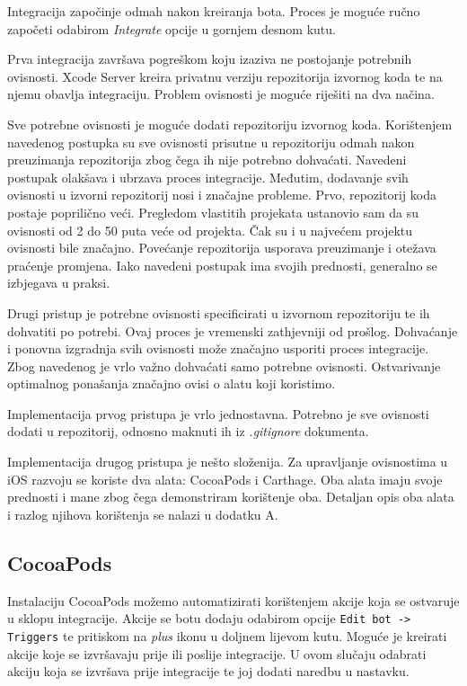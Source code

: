 \documentclass[times, utf8, diplomski, numeric]{fer}
\begin{document}
\begin{appendices}
Integracija započinje odmah nakon kreiranja bota. Proces je moguće ručno započeti odabirom \textit{Integrate} opcije u gornjem desnom kutu.

Prva integracija završava pogreškom koju izaziva ne postojanje potrebnih ovisnosti. Xcode Server kreira privatnu verziju repozitorija izvornog koda te na njemu obavlja integraciju. Problem ovisnosti je moguće riješiti na dva načina.

Sve potrebne ovisnosti je moguće dodati repozitoriju izvornog koda. Korištenjem navedenog postupka su sve ovisnosti prisutne u repozitoriju odmah nakon preuzimanja repozitorija zbog čega ih nije potrebno dohvaćati. Navedeni postupak olakšava i ubrzava proces integracije. Međutim, dodavanje svih ovisnosti u izvorni repozitorij nosi i značajne probleme. Prvo, repozitorij koda postaje poprilično veći. Pregledom vlastitih projekata ustanovio sam da su ovisnosti od 2 do 50 puta veće od projekta. Čak su i u najvećem projektu ovisnosti bile značajno. Povećanje repozitorija usporava preuzimanje i otežava praćenje promjena. Iako navedeni postupak ima svojih prednosti, generalno se izbjegava u praksi.

Drugi pristup je potrebne ovisnosti specificirati u izvornom repozitoriju te ih dohvatiti po potrebi. Ovaj proces je vremenski zathjevniji od prošlog. Dohvaćanje i ponovna izgradnja svih ovisnosti može značajno usporiti proces integracije. Zbog navedenog je vrlo važno dohvaćati samo potrebne ovisnosti. Ostvarivanje optimalnog ponašanja značajno ovisi o alatu koji koristimo.

Implementacija prvog pristupa je vrlo jednostavna. Potrebno je sve ovisnosti dodati u repozitorij, odnosno maknuti ih iz \textit{.gitignore} dokumenta.

Implementacija drugog pristupa je nešto složenija. Za upravljanje ovisnostima u iOS razvoju se koriste dva alata: CocoaPods i Carthage. Oba alata imaju svoje prednosti i mane zbog čega demonstriram korištenje oba. Detaljan opis oba alata i razlog njihova korištenja se nalazi u dodatku A.

\subsection{CocoaPods}

Instalaciju CocoaPods možemo automatizirati korištenjem akcije koja se ostvaruje u sklopu integracije. Akcije se botu dodaju odabirom opcije \verb|Edit bot -> Triggers| te pritiskom na \textit{plus} ikonu u doljnem lijevom kutu. Moguće je kreirati akcije koje se izvršavaju prije ili poslije integracije. U ovom slučaju odabrati akciju koja se izvršava prije integracije te joj dodati naredbu u nastavku.


\end{appendices}
\end{document}
